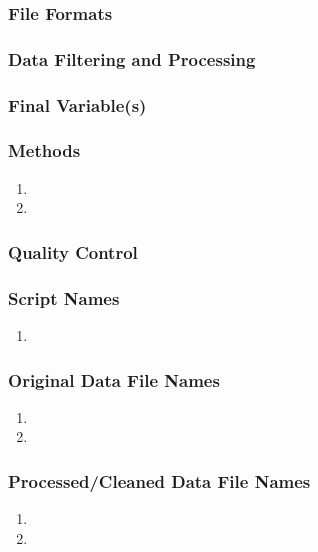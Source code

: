 


\subsubsection*{File Formats} 

\subsubsection*{Data Filtering and Processing}

\subsubsection*{Final Variable(s)}

\subsubsection*{Methods}

\begin{enumerate}
\item 
\item
\end{enumerate}

\subsubsection*{Quality Control}

\subsubsection*{Script Names}

\begin{enumerate}
\item 
\end{enumerate}

\subsubsection*{Original Data File Names}

\begin{enumerate}
\item 
\item 
\end{enumerate}

\subsubsection*{Processed/Cleaned Data File Names}

\begin{enumerate}
\item 
\item 
\end{enumerate}
